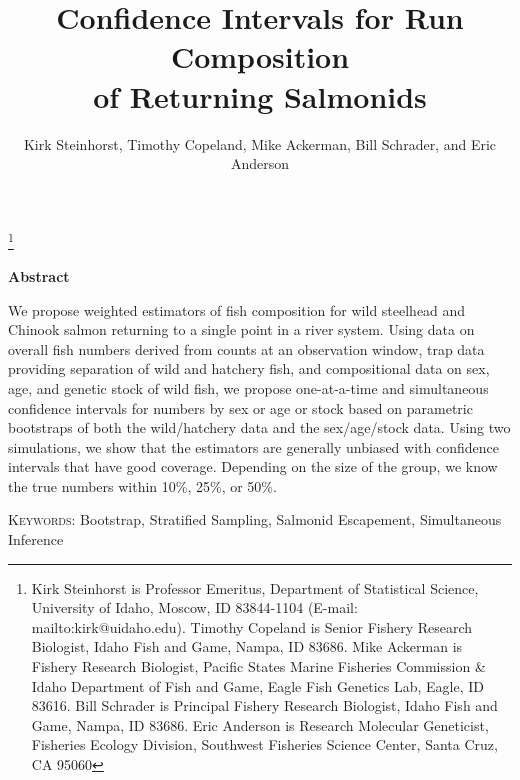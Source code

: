 \documentclass[12pt]{article}
\begin{document}
\title{Confidence Intervals for Run Composition \\ of Returning Salmonids}
\author{Kirk Steinhorst, Timothy Copeland, Mike Ackerman, Bill Schrader, and Eric Anderson 
}
\maketitle

\footnote{Kirk Steinhorst is Professor Emeritus, Department of Statistical Science, University of Idaho, Moscow, ID 83844-1104 (E-mail: mailto:kirk@uidaho.edu). Timothy Copeland is Senior Fishery Research Biologist, Idaho Fish and Game, Nampa, ID 83686. Mike Ackerman is Fishery Research Biologist, Pacific States Marine Fisheries Commission \& Idaho Department of Fish and Game, Eagle Fish Genetics Lab, Eagle, ID 83616. Bill Schrader is Principal Fishery Research Biologist, Idaho Fish and Game, Nampa, ID 83686. Eric Anderson is Research Molecular Geneticist, Fisheries Ecology Division, Southwest Fisheries Science Center, Santa Cruz, CA 95060}


\newpage
\begin{center}
\textbf{Abstract}
\end{center}
We propose weighted estimators of fish composition for wild steelhead and Chinook salmon returning to a single point in a river system.  Using data on overall fish numbers derived from counts at an observation window, trap data providing separation of wild and hatchery fish, and compositional data on sex, age, and genetic stock of wild fish, we propose one-at-a-time and simultaneous confidence intervals for numbers by sex or age or stock based on parametric bootstraps of both the wild/hatchery data and the sex/age/stock data.  Using two simulations, we show that the estimators are generally unbiased with confidence intervals that have good coverage.  Depending on the size of the group, we know the true numbers within 10\%, 25\%, or 50\%.

\vspace*{.3in}

\noindent\textsc{Keywords}: {Bootstrap, Stratified Sampling, Salmonid Escapement, Simultaneous Inference}

\newpage
\end{document}
